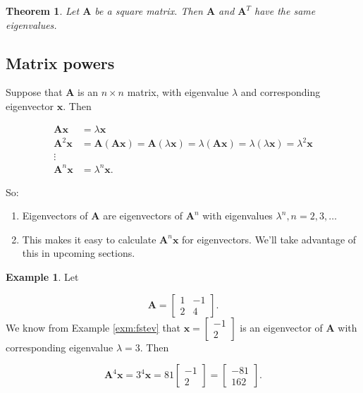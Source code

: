 \documentclass[
]{book}
\newtheorem{theorem}{Theorem}[chapter]
\theoremstyle{definition}
\theoremstyle{definition}
\newtheorem{example}{Example}[chapter]
\theoremstyle{definition}
\theoremstyle{definition}
\theoremstyle{remark}
\begin{document}
\begin{theorembox}

\begin{theorem}
Let \(\mathbf{A}\) be a square matrix. Then \(\mathbf{A}\) and \(\mathbf{A}^T\) have the same eigenvalues.
\end{theorem}

\end{theorembox}

\subsection*{Matrix powers}\label{matrix-powers}

Suppose that \(\mathbf{A}\) is an \(n\times n\) matrix, with eigenvalue \(\lambda\) and corresponding eigenvector \(\mathbf{x}\). Then

\begin{align*}
    \mathbf{A}\mathbf{x}&=\lambda \mathbf{x}\\
\mathbf{A}^2\mathbf{x}&=\mathbf{A}(\mathbf{A}\mathbf{x})=\mathbf{A}(\lambda \mathbf{x})=\lambda(\mathbf{A}\mathbf{x})=\lambda(\lambda \mathbf{x})=\lambda^2\mathbf{x}\\
\vdots & \\
\mathbf{A}^n\mathbf{x}&=\lambda^n \mathbf{x}.
\end{align*}

So:

\begin{enumerate}
\def\labelenumi{\arabic{enumi}.}
\item
  Eigenvectors of \(\mathbf{A}\) are eigenvectors of \(\mathbf{A}^n\) with eigenvalues \(\lambda^n, n=2,3,\dots\)
\item
  This makes it easy to calculate \(\mathbf{A}^n\mathbf{x}\) for eigenvectors. We'll take advantage of this in upcoming sections.
\end{enumerate}

\begin{examplebox}

\begin{example}
Let

\[\mathbf{A}=\begin{bmatrix} 1 & -1\\2 & 4\end{bmatrix}.\]
We know from Example \ref{exm:fstev} that \(\mathbf{x}=\begin{bmatrix}-1 \\2\end{bmatrix}\) is an eigenvector of \(\mathbf{A}\) with corresponding eigenvalue \(\lambda=3\). Then

\[\mathbf{A}^4\mathbf{x}=3^4\mathbf{x}=81\begin{bmatrix}-1\\2\end{bmatrix}=\begin{bmatrix}-81\\162\end{bmatrix}.\]
\end{example}

\end{examplebox}
\end{document}
